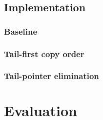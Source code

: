 \documentclass[a4paper,oneside]{memoir}
\begin{document}
\section{Implementation}

\subsection{Baseline}

\subsection{Tail-first copy order}

\subsection{Tail-pointer elimination}

\chapter{Evaluation}


\end{document}
